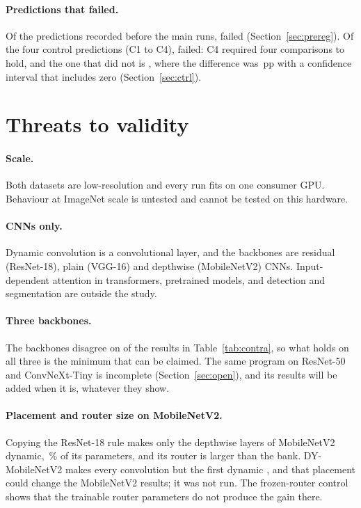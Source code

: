 \documentclass[10pt,a4paper]{article}
\begin{document}
\paragraph{Predictions that failed.} Of the  predictions recorded
before the main runs,  failed (Section~\ref{sec:prereg}).
Of the four control predictions (C1 to C4),  failed: C4 required
four comparisons to hold, and the one that did not is , where
the difference was \,pp with a confidence interval that
includes zero (Section~\ref{sec:ctrl}).

\section{Threats to validity}\label{sec:threats}

\paragraph{Scale.} Both datasets are low-resolution and every run fits on
one consumer GPU. Behaviour at ImageNet scale is untested and cannot be
tested on this hardware.

\paragraph{CNNs only.} Dynamic convolution is a convolutional layer, and
the backbones are residual (ResNet-18), plain (VGG-16) and depthwise
(MobileNetV2) CNNs. Input-dependent attention in transformers, pretrained
models, and detection and segmentation are outside the study.

\paragraph{Three backbones.} The backbones disagree on  of the
 results in Table~\ref{tab:contra}, so what holds on all three
is the minimum that can be claimed. The same program on ResNet-50 and
ConvNeXt-Tiny is incomplete (Section~\ref{sec:open}), and its results will be
added when it is, whatever they show.

\paragraph{Placement and router size on MobileNetV2.} Copying the
ResNet-18 rule makes only the depthwise layers of MobileNetV2 dynamic,
\,\% of its parameters, and its router is larger than the
bank. DY-MobileNetV2 makes every convolution but the first dynamic
\citep{chen2020dynamic}, and that placement could change the MobileNetV2
results; it was not run. The frozen-router control
shows that the trainable router parameters do not produce the gain there.
\end{document}
